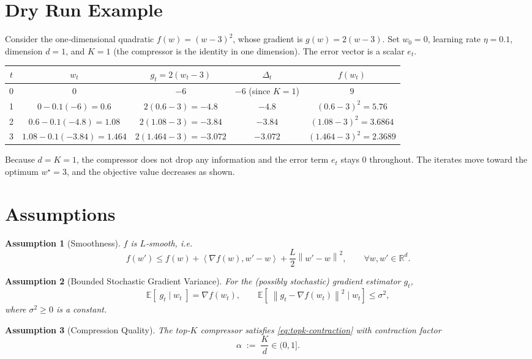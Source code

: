 \documentclass{article}
\newtheorem{assumption}{Assumption}
\newcommand{\E}{\mathbb{E}}
\newcommand{\R}{\mathbb{R}}
\newcommand{\norm}[1]{\left\|#1\right\|}
\newcommand{\ip}[2]{\left\langle #1,#2\right\rangle}
\begin{document}
\section*{Dry Run Example}
Consider the one‑dimensional quadratic $f(w)=(w-3)^2$, whose gradient is $g(w)=2(w-3)$.  
Set $w_0=0$, learning rate $\eta=0.1$, dimension $d=1$, and $K=1$ (the compressor is the identity in one dimension).  
The error vector is a scalar $e_t$.

\begin{center}
\begin{tabular}{c|c|c|c|c}
$t$ & $w_t$ & $g_t=2(w_t-3)$ & $\Delta_t$ & $f(w_t)$\\ \hline
0 & $0$   & $-6$ & $-6$ (since $K=1$) & $9$\\
1 & $0-0.1(-6)=0.6$ & $2(0.6-3)=-4.8$ & $-4.8$ & $(0.6-3)^2=5.76$\\
2 & $0.6-0.1(-4.8)=1.08$ & $2(1.08-3)=-3.84$ & $-3.84$ & $(1.08-3)^2=3.6864$\\
3 & $1.08-0.1(-3.84)=1.464$ & $2(1.464-3)=-3.072$ & $-3.072$ & $(1.464-3)^2=2.3689$
\end{tabular}
\end{center}
Because $d=K=1$, the compressor does not drop any information and the error term $e_t$ stays $0$ throughout. The iterates move toward the optimum $w^\star=3$, and the objective value decreases as shown.

\newpage
\section*{Assumptions}
\begin{assumption}[Smoothness]
\label{ass:smooth}
$f$ is $L$‑smooth, i.e.
\[
f(w')\le f(w)+\ip{\nabla f(w)}{w'-w}+\frac{L}{2}\norm{w'-w}^{2},
\qquad\forall w,w'\in\R^{d}.
\]
\end{assumption}

\begin{assumption}[Bounded Stochastic Gradient Variance]
\label{ass:variance}
For the (possibly stochastic) gradient estimator $g_t$,
\[
\E\!\left[\; g_t \mid w_t \;\right]=\nabla f(w_t),\qquad
\E\!\left[\;\norm{g_t-\nabla f(w_t)}^{2}\mid w_t\right]\le\sigma^{2},
\]
where $\sigma^{2}\ge0$ is a constant.
\end{assumption}

\begin{assumption}[Compression Quality]
\label{ass:compress}
The top‑$K$ compressor satisfies \eqref{eq:topk-contraction} with contraction factor
\[
\alpha \;:=\; \frac{K}{d}\in(0,1].
\]
\end{assumption}
\end{document}
